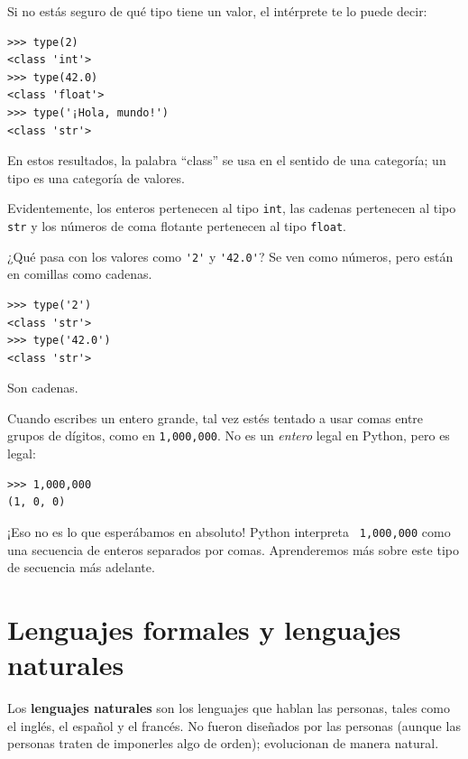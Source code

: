 \documentclass[10pt]{book}
\begin{document}
Si no estás seguro de qué tipo tiene un valor, el intérprete te lo
puede decir:

\begin{verbatim}
>>> type(2)
<class 'int'>
>>> type(42.0)
<class 'float'>
>>> type('¡Hola, mundo!')
<class 'str'>
\end{verbatim}
%
En estos resultados, la palabra ``class'' se usa en el sentido de
una categoría; un tipo es una categoría de valores.

Evidentemente, los enteros pertenecen al tipo {\tt int},
las cadenas pertenecen al tipo {\tt str} y los números de
coma flotante pertenecen al tipo {\tt float}.

¿Qué pasa con los valores como \verb"'2'" y \verb"'42.0'"?
Se ven como números, pero están en comillas como
cadenas.

\begin{verbatim}
>>> type('2')
<class 'str'>
>>> type('42.0')
<class 'str'>
\end{verbatim}
%
Son cadenas.

Cuando escribes un entero grande, tal vez estés tentado a usar comas
entre grupos de dígitos, como en {\tt 1,000,000}.  No es un
{\em entero} legal en Python, pero es legal:

\begin{verbatim}
>>> 1,000,000
(1, 0, 0)
\end{verbatim}
%
¡Eso no es lo que esperábamos en absoluto!  Python interpreta {\tt
  1,000,000} como una secuencia de enteros separados por comas.  Aprenderemos
más sobre este tipo de secuencia más adelante.




\section{Lenguajes formales y lenguajes naturales}

Los {\bf lenguajes naturales} son los lenguajes que hablan las personas,
tales como el inglés, el español y el francés.  No fueron diseñados
por las personas (aunque las personas traten de imponerles algo de orden);
evolucionan de manera natural.
\end{document}
